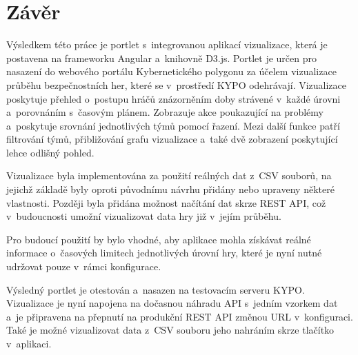 \documentclass[
  digital, %
  oneside, %
  table,   %
  nolof,     %
  nolot,     %
]{fithesis3}
\begin{document}
\chapter{Závěr}
Výsledkem této práce je portlet s~integrovanou aplikací vizualizace, která je postavena na frameworku Angular a~knihovně D3.js. Portlet je určen pro nasazení do webového portálu Kybernetického polygonu za účelem vizualizace průběhu bezpečnostních her, které se v~prostředí KYPO odehrávají. Vizualizace poskytuje přehled o~postupu hráčů znázorněním doby strávené v~každé úrovni a~porovnáním s~časovým plánem. Zobrazuje akce poukazující na problémy a~poskytuje srovnání jednotlivých týmů pomocí řazení. Mezi další funkce patří filtrování týmů, přibližování grafu vizualizace a~také dvě zobrazení poskytující lehce odlišný pohled.\par
Vizualizace byla implementována za použití reálných dat z~CSV souborů, na jejichž základě byly oproti původnímu návrhu přidány nebo upraveny některé vlastnosti. Později byla přidána možnost načítání dat skrze REST API, což v~budoucnosti umožní vizualizovat data hry již v~jejím průběhu.\par
Pro budoucí použití by bylo vhodné, aby aplikace mohla získávat reálné informace o~časových limitech jednotlivých úrovní hry, které je nyní nutné udržovat pouze v~rámci konfigurace.\par
Výsledný portlet je otestován a~nasazen na testovacím serveru KYPO. Vizualizace je nyní napojena na dočasnou náhradu API s~jedním vzorkem dat a~je připravena na přepnutí na produkční REST API změnou URL v~konfiguraci. Také je možné vizualizovat data z~CSV souboru jeho nahráním skrze tlačítko v~aplikaci.





\printbibliography
\end{document}
